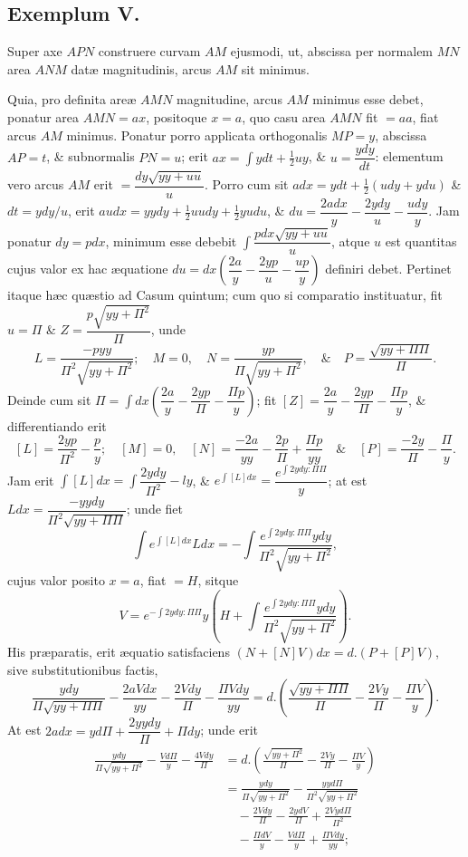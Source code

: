 \subsection*{Exemplum V.}
Super axe $APN$ construere curvam $AM$ ejusmodi, ut, abscissa per normalem $MN$ area $ANM$ datæ magnitudinis, arcus $AM$ sit minimus.

Quia, pro definita areæ $AMN$ magnitudine, arcus $AM$ minimus esse debet, ponatur area $AMN=ax$, positoque $x=a$, quo casu area $AMN$ fit $=aa$, fiat arcus $AM$ minimus. Ponatur porro applicata orthogonalis $MP=y$, abscissa $AP=t$, \& subnormalis $PN=u$; erit $ax=\int ydt+\tfrac12uy$, \& $u=\dfrac{ydy}{dt}$: elementum vero arcus $AM$ erit $=\dfrac{dy\sqrt{yy+uu}}{u}$. Porro cum sit $adx=ydt+\tfrac12(udy+ydu)$ \& $dt=ydy/u$, erit $audx=yydy+\tfrac12uudy+\tfrac12yudu$, \& $du=\dfrac{2adx}{y}-\dfrac{2ydy}{u}-\dfrac{udy}{y}$. Jam ponatur $dy=pdx$, minimum esse debebit $\int\dfrac{pdx\sqrt{yy+uu}}{u}$, atque $u$ est quantitas cujus valor ex hac æquatione $du=dx\left(\dfrac{2a}{y}-\dfrac{2yp}{u}-\dfrac{up}{y}\right)$ definiri debet. Pertinet itaque hæc quæstio ad Casum quintum; cum quo si comparatio instituatur, fit $u=\Pi$ \& $Z=\dfrac{p\sqrt{yy+\Pi^2}}{\Pi}$, unde
\[L=\frac{-pyy}{\Pi^2\sqrt{yy+\Pi^2}};\quad M=0,\quad N=\frac{yp}{\Pi\sqrt{yy+\Pi^2}},\quad\&\quad P=\frac{\sqrt{yy+\Pi\Pi}}{\Pi}.\]
Deinde cum sit $\Pi=\int dx\left(\dfrac{2a}{y}-\dfrac{2yp}{\Pi}-\dfrac{\Pi p}{y}\right)$; fit $[Z]=\dfrac{2a}{y}-\dfrac{2yp}{\Pi}-\dfrac{\Pi p}{y}$, \& differentiando erit
\[[L]=\frac{2yp}{\Pi^2}-\frac{p}{y};\quad[M]=0,\quad[N]=\frac{-2a}{yy}-\frac{2p}{\Pi}+\frac{\Pi p}{yy}\quad\&\quad[P]=\frac{-2y}{\Pi}-\frac{\Pi}{y}.\]
Jam erit $\int[L]dx=\int\dfrac{2ydy}{\Pi^2}-ly$, \& $e^{\int[L]dx}=\dfrac{e^{\int 2ydy:\Pi\Pi}}{y}$; at est $Ldx=\dfrac{-yydy}{\Pi^2\sqrt{yy+\Pi\Pi}}$; unde fiet
\[\int e^{\int[L]dx}Ldx=-\int\frac{e^{\int 2ydy:\Pi\Pi}ydy}{\Pi^2\sqrt{yy+\Pi^2}},\]
cujus valor posito $x=a$, fiat $=H$, sitque
\[V=e^{-\int 2ydy:\Pi\Pi}y\left(H+\int\frac{e^{\int 2ydy:\Pi\Pi}ydy}{\Pi^2\sqrt{yy+\Pi^2}}\right).\]
His præparatis, erit æquatio satisfaciens $(N+[N]V)dx=d.(P+[P]V)$, sive substitutionibus factis,
\[\frac{ydy}{\Pi\sqrt{yy+\Pi\Pi}}-\frac{2aVdx}{yy}-\frac{2Vdy}{\Pi}-\frac{\Pi Vdy}{yy}=d.\left(\frac{\sqrt{yy+\Pi\Pi}}{\Pi}-\frac{2Vy}{\Pi}-\frac{\Pi V}{y}\right).\]
At est $2adx=yd\Pi+\dfrac{2yydy}{\Pi}+\Pi dy$; unde erit
\[\begin{aligned}\frac{ydy}{\Pi\sqrt{yy+\Pi^2}}-\frac{Vd\Pi}{y}-\frac{4Vdy}{\Pi}
&=d.\left(\frac{\sqrt{yy+\Pi^2}}{\Pi}-\frac{2Vy}{\Pi}-\frac{\Pi V}{y}\right)\\
&=\frac{ydy}{\Pi\sqrt{yy+\Pi^2}}-\frac{yyd\Pi}{\Pi^2\sqrt{yy+\Pi^2}}\\&\quad-\frac{2Vdy}{\Pi}-\frac{2ydV}{\Pi}+\frac{2Vyd\Pi}{\Pi^2}\\&\quad-\frac{\Pi dV}{y}-\frac{Vd\Pi}{y}+\frac{\Pi Vdy}{yy};\end{aligned}\]
